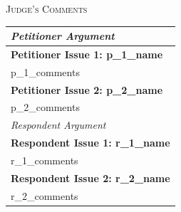 \documentclass{article}
\begin{document}
\newpage

\begin{center}
    \vspace{1em}
    {\large\textsc{Judge's Comments}}
\end{center}

\begin{table}[h!]
\centering
\renewcommand{\arraystretch}{1.8}
\begin{tabular}{|p{\linewidth}|}
\hline
\rowcolor{yellow!30}
\textit{Petitioner Argument}\\
\hline
\textbf{Petitioner Issue 1: {{ p_1_name }}}\\
\hline
{{ p_1_comments }}\\
\hline
\textbf{Petitioner Issue 2: {{ p_2_name }}}\\
\hline
{{ p_2_comments }}\\
\hline
\rowcolor{cyan!20}
\textit{Respondent Argument}\\
\hline
\textbf{Respondent Issue 1: {{ r_1_name }}}\\
\hline
{{ r_1_comments }}\\
\hline
\textbf{Respondent Issue 2: {{ r_2_name }}}\\
\hline
{{ r_2_comments }}\\
\hline
\end{tabular}
\end{table}
\end{document}
